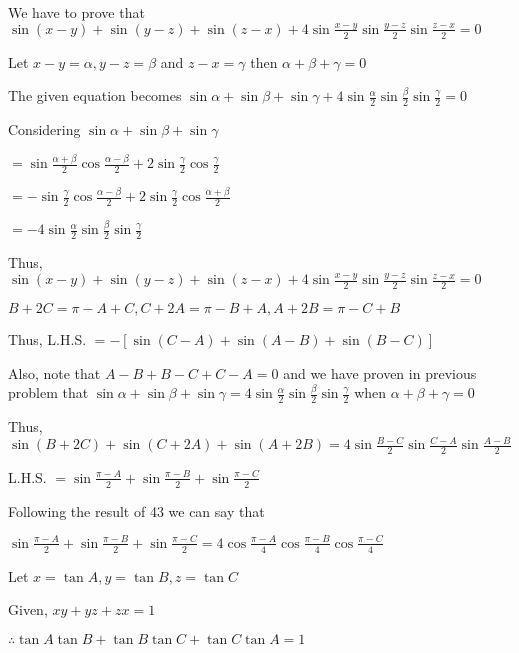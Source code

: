 \item We have to prove that $\sin(x - y) + \sin(y - z) + \sin(z - x) + 4\sin\frac{x - y}{2}\sin\frac{y - z}{2}\sin \frac{z -
  x}{2} = 0$

  Let $x - y = \alpha, y - z = \beta$ and $z - x = \gamma$ then $\alpha + \beta + \gamma = 0$

  The given equation becomes $\sin\alpha + \sin\beta + \sin\gamma +
  4\sin\frac{\alpha}{2}\sin\frac{\beta}{2}\sin\frac{\gamma}{2} = 0$

  Considering $\sin\alpha + \sin\beta + \sin\gamma$

  $= \sin\frac{\alpha + \beta}{2}\cos\frac{\alpha - \beta}{2} + 2\sin\frac{\gamma}{2}\cos\frac{\gamma}{2}$

  $= -\sin\frac{\gamma}{2}\cos\frac{\alpha - \beta}{2} + 2\sin\frac{\gamma}{2}\cos\frac{\alpha + \beta}{2}$

  $= -4\sin\frac{\alpha}{2}\sin\frac{\beta}{2}\sin\frac{\gamma}{2}$

  Thus, $\sin(x - y) + \sin(y - z) + \sin(z - x) + 4\sin\frac{x - y}{2}\sin\frac{y - z}{2}\sin \frac{z - x}{2} = 0$

\item $B + 2C = \pi - A + C, C + 2A = \pi - B + A, A + 2B = \pi - C + B$

  Thus, L.H.S. $= -[\sin(C - A) + \sin(A - B) + \sin(B - C)]$

  Also, note that $A - B + B - C + C - A = 0$ and we have proven in previous problem that $\sin\alpha + \sin\beta +
  \sin\gamma = 4\sin\frac{\alpha}{2}\sin\frac{\beta}{2}\sin\frac{\gamma}{2}$ when $\alpha + \beta + \gamma = 0$

  Thus, $\sin(B + 2C) + \sin(C + 2A) + \sin(A + 2B) = 4\sin\frac{B - C}{2}\sin\frac{C - A}{2}\sin\frac{A - B}{2}$

\item L.H.S. $= \sin\frac{\pi - A}{2} + \sin\frac{\pi - B}{2} + \sin\frac{\pi - C}{2}$

  Following the result of 43 we can say that

  $\sin\frac{\pi - A}{2} + \sin\frac{\pi - B}{2} + \sin\frac{\pi - C}{2} = 4\cos\frac{\pi - A}{4}\cos\frac{\pi -
    B}{4}\cos\frac{\pi - C}{4}$

\item Let $x = \tan A, y = \tan B, z = \tan C$

  Given, $xy + yz + zx = 1$

  $\therefore \tan A\tan B + \tan B\tan C + \tan C\tan A = 1$

